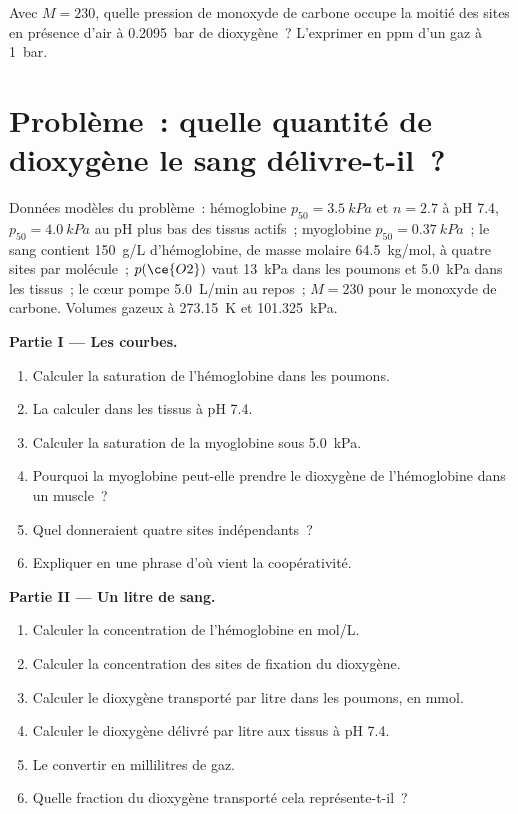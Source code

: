 \begin{exercise}[$\star\star\star$]\label{exo:b3:bioinorganic:12}
Avec $M = 230$, quelle pression de monoxyde de carbone occupe la moitié des
sites en présence d'air à \qty{0.2095}{bar} de dioxygène~? L'exprimer en ppm d'un gaz à \qty{1}{bar}.
\end{exercise}

\section{Problème~: quelle quantité de dioxygène le sang délivre-t-il~?}

\begin{problem}
\label{pb:b3:bioinorganic:1}
Données modèles du problème~: hémoglobine $p_{50} = \qty{3.5}{kPa}$ et $n = 2.7$ à pH 7.4, $p_{50} = \qty{4.0}{kPa}$ au
pH plus bas des tissus actifs~; myoglobine $p_{50} = \qty{0.37}{kPa}$~; le sang contient \qty{150}{g/L}
d'hémoglobine, de masse molaire \qty{64.5}{kg/mol}, à quatre sites par molécule~; $p(\ce{O2})$ vaut \qty{13}{kPa}
dans les poumons et \qty{5.0}{kPa} dans les tissus~; le cœur pompe
\qty{5.0}{L/min} au repos~;
$M = 230$ pour le monoxyde de carbone. Volumes gazeux à \qty{273.15}{K} et \qty{101.325}{kPa}.

\medskip\noindent\textbf{Partie I --- Les courbes.}
\begin{enumerate}
  \item Calculer la saturation de l'hémoglobine dans les poumons.
  \item La calculer dans les tissus à pH 7.4.
  \item Calculer la saturation de la myoglobine sous \qty{5.0}{kPa}.
  \item Pourquoi la myoglobine peut-elle prendre le dioxygène de
        l'hémoglobine dans un muscle~?
  \item Quel  donneraient quatre sites indépendants~?
  \item Expliquer en une phrase d'où vient la coopérativité.
\end{enumerate}

\medskip\noindent\textbf{Partie II --- Un litre de sang.}
\begin{enumerate}[resume]
  \item Calculer la concentration de l'hémoglobine en mol/L.
  \item Calculer la concentration des sites de fixation du dioxygène.
  \item Calculer le dioxygène transporté par litre dans les poumons, en
        mmol.
  \item Calculer le dioxygène délivré par litre aux tissus à pH 7.4.
  \item Le convertir en millilitres de gaz.
  \item Quelle fraction du dioxygène transporté cela représente-t-il~?
\end{enumerate}


\end{problem}
